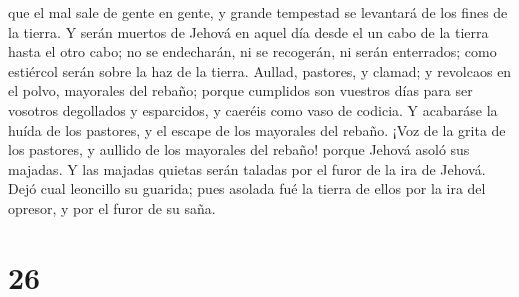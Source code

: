 que el mal sale de gente en gente, y grande tempestad se levantará de
los fines de la tierra.  Y serán muertos de Jehová en aquel
día desde el un cabo de la tierra hasta el otro cabo; no se endecharán,
ni se recogerán, ni serán enterrados; como estiércol serán sobre la haz
de la tierra.  Aullad, pastores, y clamad; y revolcaos en
el polvo, mayorales del rebaño; porque cumplidos son vuestros días para
ser vosotros degollados y esparcidos, y caeréis como vaso de codicia.
 Y acabaráse la huída de los pastores, y el escape de los
mayorales del rebaño.  ¡Voz de la grita de los pastores, y
aullido de los mayorales del rebaño! porque Jehová asoló sus majadas.
 Y las majadas quietas serán taladas por el furor de la ira
de Jehová.  Dejó cual leoncillo su guarida; pues asolada
fué la tierra de ellos por la ira del opresor, y por el furor de su
saña.

\hypertarget{section-25}{%
\section{26}\label{section-25}}

